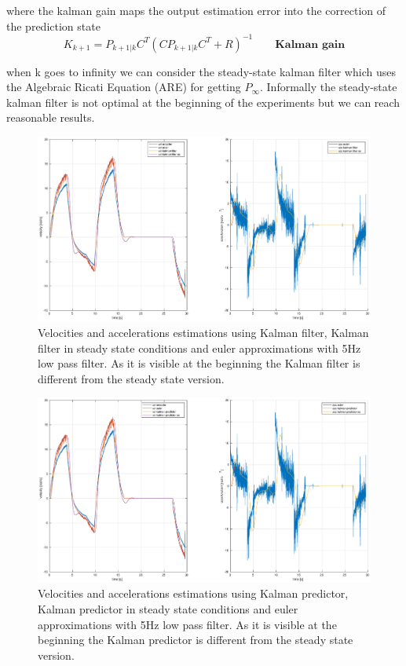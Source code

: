 \documentclass[a4paper,12pt]{article}
\begin{document}
\bigskip
where the kalman gain maps the output estimation error into the correction of the prediction state
\[
    K_{k+1} = P_{k+1|k}C^T(CP_{k+1|k}C^T+R)^{-1} \qquad \textbf{Kalman gain}
\]

when k goes to infinity we can consider the steady-state kalman filter which uses the Algebraic Ricati Equation (ARE) for getting $P_{\infty}$. Informally the steady-state kalman filter is not optimal at the beginning of the experiments but we can reach reasonable results.

\begin{figure}[H]
    \begin{center}
        \hspace*{-4.6cm}
        \includegraphics[scale=0.5]{images/kalman_filter.eps}
    \end{center}
    \caption{Velocities and accelerations estimations using Kalman filter, Kalman filter in steady state conditions and euler approximations with 5Hz low pass filter. As it is visible at the beginning the Kalman filter is different from the steady state version.}
    \label{fig:kalman_filter}
\end{figure}

\begin{figure}[H]
    \begin{center}
        \hspace*{-4.6cm}
        \includegraphics[scale=0.5]{images/kalman_predictor.eps}
    \end{center}
    \caption{Velocities and accelerations estimations using Kalman predictor, Kalman predictor in steady state conditions and euler approximations with 5Hz low pass filter. As it is visible at the beginning the Kalman predictor is different from the steady state version.}
    \label{fig:kalman_predictor}
\end{figure}
\end{document}
